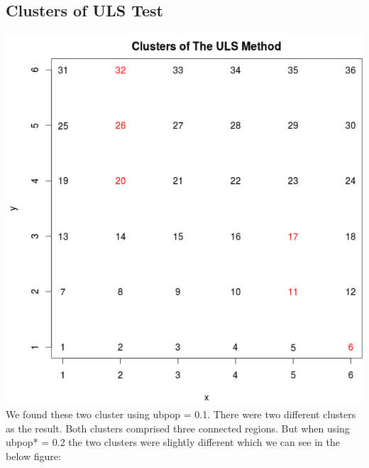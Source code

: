 \documentclass[12pt]{article}
\begin{document}
	\subsection{Clusters of ULS Test}
	 \includegraphics[scale=0.35]{test_2_01} \\ We found these two cluster using ubpop = 0.1. There were two different clusters as the result. Both clusters comprised three connected regions. But when using ubpop* = 0.2 the two clusters were slightly different which we can see in the below figure:\\
	 
\end{document}
